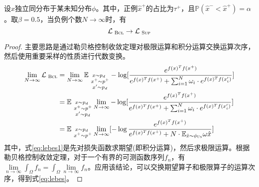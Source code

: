 \begin{theorem}[渐进无偏估计]
设$\hat{x}$独立同分布于某未知分布$\phi$。其中，正例$\hat x^+$的占比为$\tau^+$，且$\mathbb P (\hat x^- < \hat x^+)= \alpha$ 。取$\beta = 0.5$，当负例个数$N\rightarrow \infty$时，有
\[ \mathcal{L}_\textsc{~Bcl}\rightarrow\mathcal{L}_\textsc{~Sup} \]

\begin{proof}
主要思路是通过勒贝格控制收敛定理\cite{tao:shi}对极限运算和积分运算交换运算次序，然后使用重要采样的性质进行代数变换。
\begin{align}
	\lim_{N\rightarrow \infty} \mathcal{L}_\textsc{~Bcl} &= \lim_{N\rightarrow \infty}   \mathbb E_{\substack{x \sim p_d\\~x^+ \sim p^+\\~x^\prime \sim p_d}} -\log[ \frac{e^{f(x)^Tf(x^+)}}{e^{f(x)^Tf(x^+)} +  \sum_{i=1}^N  \omega_i\cdot e^{f(x)^Tf(x^\prime_i)} }]  \label{eq:lebes1}\\ 
	&=  \mathbb E_{\substack{x \sim p_d\\~x^+ \sim p^+\\~x^\prime \sim p_d}} \lim_{N\rightarrow \infty} -\log[ \frac{e^{f(x)^Tf(x^+)}}{e^{f(x)^Tf(x^+)} +  \sum_{i=1}^N  \omega_i\cdot e^{f(x)^Tf(x^\prime_i)} }]  \label{eq:lebes}\\ 
	&= \mathbb E_{\substack{x \sim p_d\\~x^+ \sim p^+} }	\lim_{N\rightarrow \infty}[-\log \frac{e^{f(x)^Tf(x^+)}}{e^{f(x)^Tf(x^+)} + N\cdot \mathbb{E}_{\hat{x} \sim \phi_{\textsc{Un}} } \omega\hat x  }] \label{eq:bcldenomitor}
\end{align}
其中，式\eqref{eq:lebes1}是先对损失函数求期望(即积分运算)，然后求极限运算。根据勒贝格控制收敛定理\cite{tao:shi}，对于一个有界的可测函数序列$f_n$，有$\lim\limits_{n\rightarrow \infty} \int_{\Omega} f_n =\int_{\Omega} \lim\limits_{n\rightarrow\infty}f_n $。应用该结论，可以交换期望算子和极限算子的运算次序，得到式\eqref{eq:lebes}。


\end{proof}
\end{theorem}

